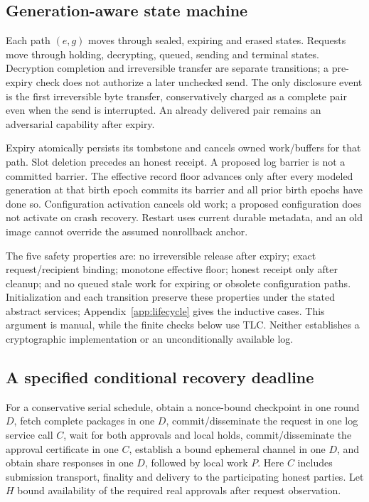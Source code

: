 \documentclass[pdflatex,sn-mathphys-num]{sn-jnl}
\theoremstyle{plain}
\theoremstyle{definition}
\begin{document}
\subsection{Generation-aware state machine}
Each path $(e,g)$ moves through sealed, expiring and erased states. Requests move through holding, decrypting, queued, sending and terminal states. Decryption completion and irreversible transfer are separate transitions; a pre-expiry check does not authorize a later unchecked send. The only disclosure event is the first irreversible byte transfer, conservatively charged as a complete pair even when the send is interrupted. An already delivered pair remains an adversarial capability after expiry.

Expiry atomically persists its tombstone and cancels owned work/buffers for that path. Slot deletion precedes an honest receipt. A proposed log barrier is not a committed barrier. The effective record floor advances only after every modeled generation at that birth epoch commits its barrier and all prior birth epochs have done so. Configuration activation cancels old work; a proposed configuration does not activate on crash recovery. Restart uses current durable metadata, and an old image cannot override the assumed nonrollback anchor.

The five safety properties are: no irreversible release after expiry; exact request/recipient binding; monotone effective floor; honest receipt only after cleanup; and no queued stale work for expiring or obsolete configuration paths. Initialization and each transition preserve these properties under the stated abstract services; Appendix~\ref{app:lifecycle} gives the inductive cases. This argument is manual, while the finite checks below use TLC. Neither establishes a cryptographic implementation or an unconditionally available log.

\subsection{A specified conditional recovery deadline}
For a conservative serial schedule, obtain a nonce-bound checkpoint in one round $D$, fetch complete packages in one $D$, commit/disseminate the request in one log service call $C$, wait for both approvals and local holds, commit/disseminate the approval certificate in one $C$, establish a bound ephemeral channel in one $D$, and obtain share responses in one $D$, followed by local work $P$. Here $C$ includes submission transport, finality and delivery to the participating honest parties. Let $H$ bound availability of the required real approvals after request observation.
\end{document}
